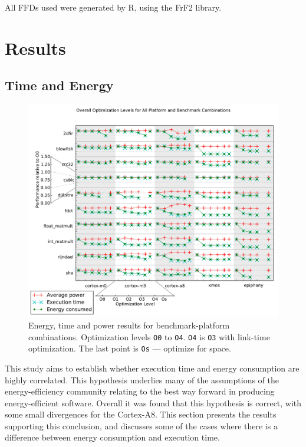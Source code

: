 \documentclass[twocolumn]{article}
\let\oldcaption\caption
\renewcommand{\caption}[1]{\oldcaption{\textup{#1}}}
\begin{document}
All FFDs used were generated by R\cite{R}, using the FrF2 library\cite{FrF2}.


\section{Results}

\subsection*{Time and Energy}


\begin{figure}[tb!]
	\centering
	\includegraphics[width=\textwidth,clip, trim=0cm 0cm 0 2.1cm]{levels.pdf}
	\caption{Energy, time and power results for benchmark-platform combinations. Optimization levels \texttt{O0} to \texttt{O4}. \texttt{O4} is \texttt{O3} with link-time optimization. The last point is \texttt{Os} --- optimize for space. }
	\label{Fig:OverallView}
\end{figure}
This study aims to establish whether execution time and energy consumption are
highly correlated. This hypothesis underlies many of the assumptions of the
energy-efficiency community relating to the best way forward in producing
energy-efficient software. Overall it was found that this hypothesis is
correct, with some small divergences for the Cortex-A8. This section presents
the results supporting this conclusion, and discusses some of the cases where
there is a difference between energy consumption and execution time.
\end{document}

